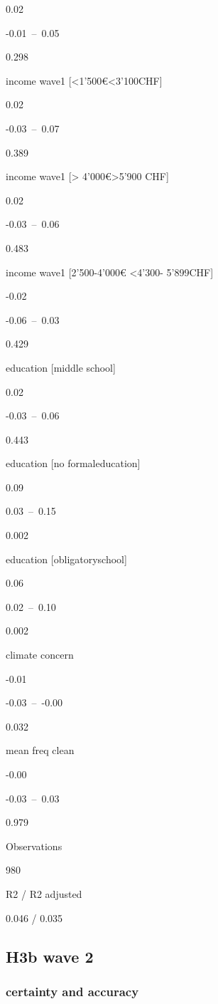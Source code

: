 \documentclass[
]{article}
\begin{document}
0.02

-0.01~--~0.05

0.298

income wave1 {[}\textless1'500€\textless3'100CHF{]}

0.02

-0.03~--~0.07

0.389

income wave1 {[}\textgreater{} 4'000€\textgreater5'900 CHF{]}

0.02

-0.03~--~0.06

0.483

income wave1 {[}2'500-4'000€ \textless4'300- 5'899CHF{]}

-0.02

-0.06~--~0.03

0.429

education {[}middle school{]}

0.02

-0.03~--~0.06

0.443

education {[}no formaleducation{]}

0.09

0.03~--~0.15

0.002

education {[}obligatoryschool{]}

0.06

0.02~--~0.10

0.002

climate concern

-0.01

-0.03~--~-0.00

0.032

mean freq clean

-0.00

-0.03~--~0.03

0.979

Observations

980

R2 / R2 adjusted

0.046 / 0.035

\hypertarget{h3b-wave-2}{%
\subsection{H3b wave 2}\label{h3b-wave-2}}

\hypertarget{certainty-and-accuracy}{%
\subsubsection{certainty and accuracy}\label{certainty-and-accuracy}}
\end{document}
